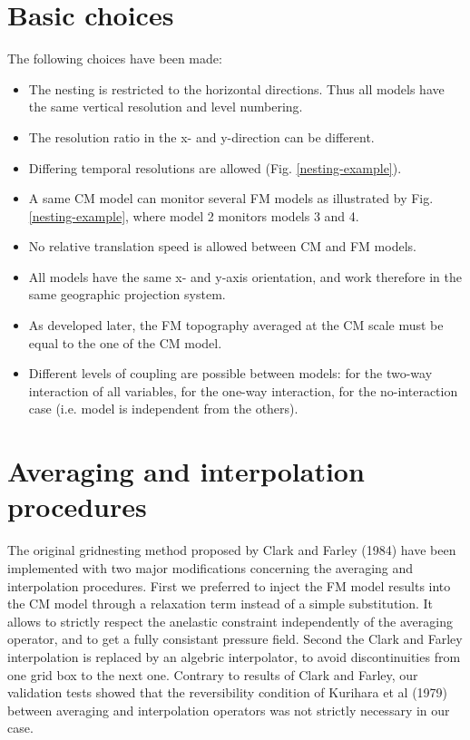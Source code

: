 \section{Basic choices}

 The following choices have been made:

\begin{itemize}
\item The nesting is restricted to the horizontal directions. Thus all models
have the same vertical resolution and level numbering.
\item The resolution ratio in the x- and y-direction can be different.
\item Differing temporal resolutions are allowed (Fig. \ref{nesting-example}).
\item A same CM model can monitor several FM models as illustrated by
Fig. \ref{nesting-example}, where model 2 monitors models 3 and 4.
\item No relative translation speed is allowed between CM and FM models.
\item All models have the same x- and y-axis orientation, and work therefore
in the same geographic projection system.
\item As developed later, the FM topography averaged at the CM scale must be
equal to the one of the CM model.
\item Different levels of coupling are possible between models:
 for the two-way interaction of all variables,
 for the one-way interaction,
 for the no-interaction case (i.e. model is independent
from the others).
\end{itemize}

\section{Averaging and interpolation procedures}

 The original gridnesting method proposed by Clark and Farley (1984)
have been implemented with two major modifications concerning the
averaging and interpolation procedures. First we preferred to inject the FM
model results into the CM model through a relaxation term instead of a
simple substitution. It allows to strictly respect the anelastic constraint
independently of the averaging operator, and to get a fully consistant pressure
field. Second the Clark and Farley interpolation is replaced by an
algebric interpolator, to avoid discontinuities from one grid box to the next
one. Contrary to results of Clark and Farley, our validation tests showed that
the reversibility condition of Kurihara et al (1979) between averaging and
interpolation operators was not strictly necessary in our case.

